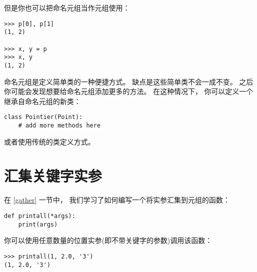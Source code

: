 
但是你也可以把命名元组当作元组使用：

\begin{lstlisting}
>>> p[0], p[1]
(1, 2)

>>> x, y = p
>>> x, y
(1, 2)
\end{lstlisting}


命名元组是定义简单类的一种便捷方式。
缺点是这些简单类不会一成不变。
之后你可能会发现想要给命名元组添加更多的方法。
在这种情况下， 你可以定义一个继承自命名元组的新类：

\begin{lstlisting}
class Pointier(Point):
    # add more methods here
\end{lstlisting}


或者使用传统的类定义方式。

\section{汇集关键字实参}


在 \ref{gather} 一节中， 我们学习了如何编写一个将实参汇集到元组的函数：

\begin{lstlisting}
def printall(*args):
    print(args)
\end{lstlisting}


你可以使用任意数量的位置实参(即不带关键字的参数)调用该函数：

\begin{lstlisting}
>>> printall(1, 2.0, '3')
(1, 2.0, '3')
\end{lstlisting}

